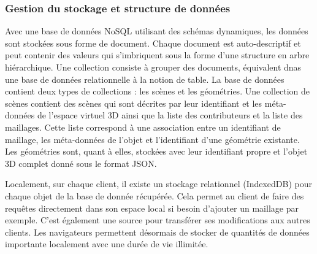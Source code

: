 %
%
%
%
%
\subsubsection{Gestion du stockage et structure de données}

Avec une base de données NoSQL utilisant des schémas dynamiques, les 
données sont stockées sous forme de document. Chaque document est 
auto-descriptif et peut contenir des valeurs qui s'imbriquent sous la forme d'une 
structure en arbre hiérarchique. Une collection consiste à grouper des documents, 
équivalent dnas une base de données relationnelle à la notion de table. La base de 
données contient deux types de collections : les scènes et les géométries. Une 
collection de scènes contient des scènes qui sont décrites par leur identifiant et 
les méta-données de l'espace virtuel 3D ainsi que la liste des contributeurs et la 
liste des maillages. Cette liste correspond à une association entre un identifiant de 
maillage, les méta-données de l'objet et l'identifiant d'une géométrie existante. 
Les géométries sont, quant à elles, stockées avec leur identifiant propre et l'objet 
3D complet donné sous le format \gls{JSON}.

Localement, sur chaque client, il existe un stockage relationnel (IndexedDB) pour 
chaque objet de la base de donnée récupérée. Cela permet au client de faire des 
requêtes directement dans son espace local si besoin d'ajouter un maillage par 
exemple. 
C'est également une source pour transférer ses modifications aux autres clients.
Les navigateurs permettent désormais de stocker de quantités de données 
importante localement avec une durée de vie illimitée. 

